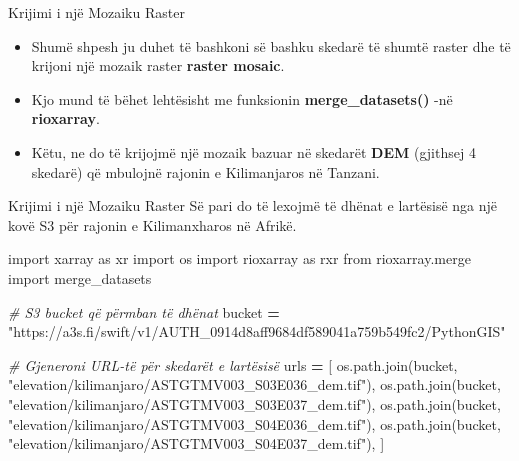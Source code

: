 \documentclass[
  ignorenonframetext,
]{beamer}
\newenvironment{Shaded}{\begin{snugshade}}{\end{snugshade}}
\newcommand{\CommentTok}[1]{\textcolor[rgb]{0.56,0.35,0.01}{\textit{#1}}}
\newcommand{\ImportTok}[1]{#1}
\newcommand{\NormalTok}[1]{#1}
\newcommand{\OperatorTok}[1]{\textcolor[rgb]{0.81,0.36,0.00}{\textbf{#1}}}
\newcommand{\StringTok}[1]{\textcolor[rgb]{0.31,0.60,0.02}{#1}}
\begin{document}
\begin{frame}{Krijimi i një Mozaiku Raster}
\protect\hypertarget{krijimi-i-njuxeb-mozaiku-raster}{}
\begin{itemize}
\item
  Shumë shpesh ju duhet të bashkoni së bashku skedarë të shumtë raster
  dhe të krijoni një mozaik raster \textbf{raster mosaic}.
\item
  Kjo mund të bëhet lehtësisht me funksionin \textbf{merge\_datasets()}
  -në \textbf{rioxarray}.
\item
  Këtu, ne do të krijojmë një mozaik bazuar në skedarët \textbf{DEM}
  (gjithsej 4 skedarë) që mbulojnë rajonin e Kilimanjaros në Tanzani.
\end{itemize}
\end{frame}

\begin{frame}[fragile]{Krijimi i një Mozaiku Raster}
\protect\hypertarget{krijimi-i-njuxeb-mozaiku-raster-1}{}
Së pari do të lexojmë të dhënat e lartësisë nga një kovë S3 për rajonin
e Kilimanxharos në Afrikë.


\begin{Shaded}
\begin{Highlighting}[]
\ImportTok{import}\NormalTok{ xarray }\ImportTok{as}\NormalTok{ xr}
\ImportTok{import}\NormalTok{ os}
\ImportTok{import}\NormalTok{ rioxarray }\ImportTok{as}\NormalTok{ rxr}
\ImportTok{from}\NormalTok{ rioxarray.merge }\ImportTok{import}\NormalTok{ merge\_datasets}

\CommentTok{\# S3 bucket që përmban të dhënat}
\NormalTok{bucket }\OperatorTok{=} \StringTok{"https://a3s.fi/swift/v1/AUTH\_0914d8aff9684df589041a759b549fc2/PythonGIS"}

\CommentTok{\# Gjeneroni URL{-}të për skedarët e lartësisë}
\NormalTok{urls }\OperatorTok{=}\NormalTok{ [}
\NormalTok{    os.path.join(bucket, }\StringTok{"elevation/kilimanjaro/ASTGTMV003\_S03E036\_dem.tif"}\NormalTok{),}
\NormalTok{    os.path.join(bucket, }\StringTok{"elevation/kilimanjaro/ASTGTMV003\_S03E037\_dem.tif"}\NormalTok{),}
\NormalTok{    os.path.join(bucket, }\StringTok{"elevation/kilimanjaro/ASTGTMV003\_S04E036\_dem.tif"}\NormalTok{),}
\NormalTok{    os.path.join(bucket, }\StringTok{"elevation/kilimanjaro/ASTGTMV003\_S04E037\_dem.tif"}\NormalTok{),}
\NormalTok{]}
\end{Highlighting}
\end{Shaded}
\end{frame}
\end{document}
